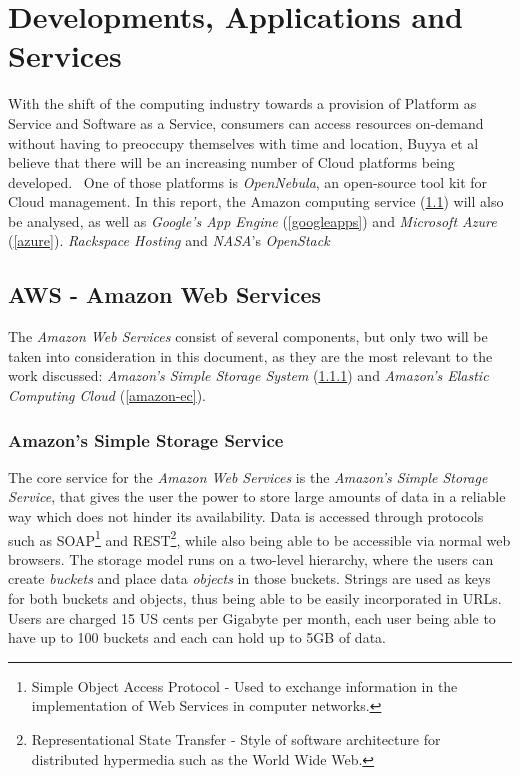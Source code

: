 \section{Developments, Applications and Services}
With the shift of the computing industry towards a provision of Platform as Service and Software as a Service, consumers can access resources on-demand without having to preoccupy themselves with time and location, Buyya et al believe that there will be an increasing number of Cloud platforms being developed.~\cite{Buyya2009599} One of those platforms is \textit{OpenNebula}, an open-source tool kit for Cloud management. In this report, the Amazon computing service (\ref{aws}) will also be analysed, as well as \textit{Google's App Engine} (\ref{googleapps}) and \textit{Microsoft Azure} (\ref{azure}).
\textit{Rackspace Hosting} and \textit{NASA}'s \textit{OpenStack} 

\subsection{AWS - Amazon Web Services}\label{aws}

The \textit{Amazon Web Services} consist of several components, but only two will be taken into consideration in this document, as they are the most relevant to the work discussed: \textit{Amazon's Simple Storage System} (\ref{amazon-sss}) and \textit{Amazon's Elastic Computing Cloud} (\ref{amazon-ec}).

\subsubsection{Amazon's Simple Storage Service}\label{amazon-sss}

The core service for the \textit{Amazon Web Services} is the \textit{Amazon's Simple Storage Service}, that gives the user the power to store large amounts of data in a reliable way which does not hinder its availability. Data is accessed through protocols such as SOAP\footnote{Simple Object Access Protocol - Used to exchange information in the implementation of Web Services in computer networks.} and REST\footnote{Representational State Transfer - Style of software architecture for distributed hypermedia such as the World Wide Web.}, while also being able to be accessible via normal web browsers.
The storage model runs on a two-level hierarchy, where the users can create \textit{buckets} and place data \textit{objects} in those buckets. Strings are used as keys for both buckets and objects, thus being able to be easily incorporated in URLs. Users are charged 15 US cents per Gigabyte per month, each user being able to have up to 100 buckets and each can hold up to 5GB of data.\cite{hazel}

